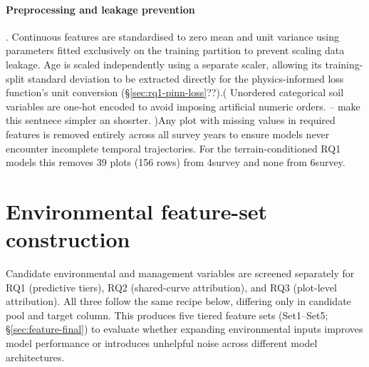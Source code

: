 \paragraph*{Preprocessing and leakage prevention}. Continuous features are standardised to zero mean and unit variance using parameters fitted exclusively on the training partition to prevent scaling data leakage. Age is scaled independently using a separate scaler, allowing its training-split standard deviation to be extracted directly for the physics-informed loss function's unit conversion (\S\ref{sec:rq1-pinn-loss}??).( Unordered categorical soil variables are one-hot encoded to avoid imposing artificial numeric orders.  -- make this sentnece simpler an shosrter. )Any plot with missing values in required features is removed entirely across all survey years to ensure models never encounter incomplete temporal trajectories. For the terrain-conditioned RQ1 models this removes 39 plots (156 rows) from 4survey and none from 6survey. 


\section{Environmental feature-set construction}
Candidate environmental and management variables are screened separately for RQ1 (predictive tiers), RQ2 (shared-curve attribution), and RQ3 (plot-level attribution). All three follow the same recipe below, differing only in candidate pool and
target column. This produces five tiered feature sets (Set1–Set5; \S\ref{sec:feature-final}) to evaluate whether expanding environmental inputs improves model performance or introduces unhelpful noise across different model architectures.

